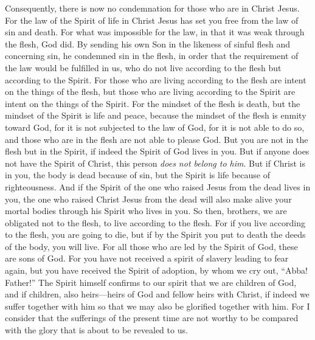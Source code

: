 \begin{biblechapter} %
 Consequently, there is now no condemnation for those who are in Christ Jesus.
\verse For the law of the Spirit of life in Christ Jesus has set you free from the law of sin and death.
\verse For what was impossible for the law, in that it was weak through the flesh, God did. By sending his own Son in the likeness of sinful flesh and concerning sin, he condemned sin in the flesh,
\verse in order that the requirement of the law would be fulfilled in us, who do not live according to the flesh but according to the Spirit.
\verse For those who are living according to the flesh are intent on the things of the flesh, but those who are living according to the Spirit are intent on the things of the Spirit.
\verse For the mindset of the flesh is death, but the mindset of the Spirit is life and peace,
\verse because the mindset of the flesh is enmity toward God, for it is not subjected to the law of God, for it is not able to do so,
\verse and those who are in the flesh are not able to please God.
\verse But you are not in the flesh but in the Spirit, if indeed the Spirit of God lives in you. But if anyone does not have the Spirit of Christ, this person \textit{does not belong to him}.
\verse But if Christ is in you, the body is dead because of sin, but the Spirit is life because of righteousness.
\verse And if the Spirit of the one who raised Jesus from the dead lives in you, the one who raised Christ Jesus from the dead will also make alive your mortal bodies through his Spirit who lives in you.
\verse So then, brothers, we are obligated not to the flesh, to live according to the flesh.
\verse For if you live according to the flesh, you are going to die, but if by the Spirit you put to death the deeds of the body, you will live.
\verse For all those who are led by the Spirit of God, these are sons of God.
\verse For you have not received a spirit of slavery leading to fear again, but you have received the Spirit of adoption, by whom we cry out, “Abba! Father!”
\verse The Spirit himself confirms to our spirit that we are children of God,
\verse and if children, also heirs—heirs of God and fellow heirs with Christ, if indeed we suffer together with him so that we may also be glorified together with him.
 For I consider that the sufferings of the present time are not worthy to be compared with the glory that is about to be revealed to us.

\end{biblechapter}
